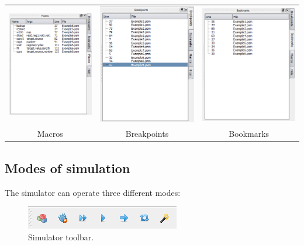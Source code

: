         \begin{table}[h!]
            \begin{tabular}{ccc}
                \includegraphics[width=.3\textwidth]{img/listmacros.png}
                    &
                \includegraphics[width=.3\textwidth]{img/listbreakpoints.png}
                    &
                \includegraphics[width=.3\textwidth]{img/listbookmarks.png}
                \\ Macros & Breakpoints & Bookmarks
            \end{tabular}
        \end{table}


    \subsection{Modes of simulation}
        The simulator can operate three different modes:

        \begin{figure}[h!]
            \centering
            \includegraphics[width=.4\textwidth]{img/simulation_panel.png}
            \caption{Simulator toolbar.}
        \end{figure}


